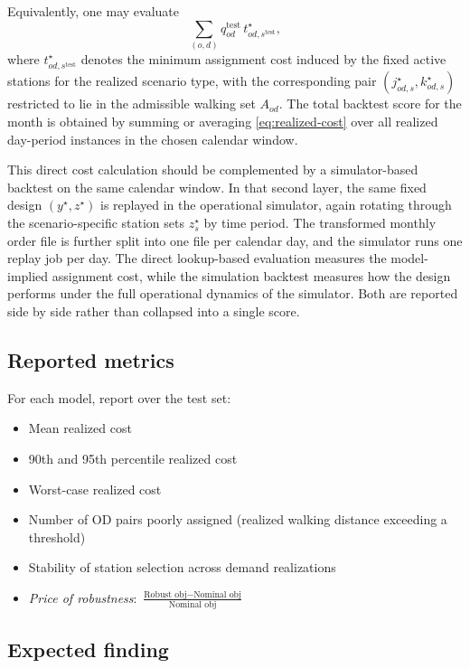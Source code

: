 \documentclass[11pt]{article}
\theoremstyle{definition}
\begin{document}
Equivalently, one may evaluate
\[
	\sum_{(o,d)} q_{od}^{\mathrm{test}}\,t^\star_{od,s^{\mathrm{test}}},
\]
where $t^\star_{od,s^{\mathrm{test}}}$ denotes the minimum assignment cost
induced by the fixed active stations for the realized scenario type, with the
corresponding pair $(j^\star_{od,s}, k^\star_{od,s})$ restricted to lie in the
admissible walking set $A_{od}$.  The total backtest score for the month is
obtained by summing or averaging
\eqref{eq:realized-cost} over all realized day-period instances in the chosen
calendar window.

This direct cost calculation should be complemented by a simulator-based
backtest on the same calendar window.  In that second layer, the same fixed
design $(y^\star, z^\star)$ is replayed in the operational simulator, again
rotating through the scenario-specific station sets $z_s^\star$ by time period.
The transformed monthly order file is further split into one file per calendar
day, and the simulator runs one replay job per day.  The direct lookup-based
evaluation measures the model-implied assignment cost, while the simulation
backtest measures how the design performs under the full operational dynamics
of the simulator.  Both are reported side by side rather than collapsed into a
single score.

\subsection{Reported metrics}

For each model, report over the test set:
\begin{itemize}
	\item Mean realized cost
	\item 90th and 95th percentile realized cost
	\item Worst-case realized cost
	\item Number of OD pairs poorly assigned (realized walking distance exceeding a threshold)
	\item Stability of station selection across demand realizations
	\item \emph{Price of robustness}:
	      $\displaystyle\frac{\text{Robust obj} - \text{Nominal obj}}{\text{Nominal obj}}$
\end{itemize}

\subsection{Expected finding}
\end{document}
